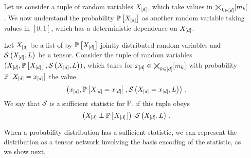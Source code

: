 

Let us consider a tuple of random variables $X_{[d]}$, which take values in $\bigtimes_{k\in[d]}[m_{k}]$.
We now understand the probability $\mathbb{P}\left[X_{[d]}\right]$ as another random variable taking values in $[0,1]$, which has a deterministic dependence on $X_{[d]}$.

\begin{definition}
    Let $X_{[d]}$ be a list of by $\mathbb{P}\left[X_{[d]}\right]$ jointly distributed random variables and $\mathcal{S}\left(X_{[d]},L\right)$ be a tensor.
    Consider the tuple of random variables $(X_{[d]},\mathbb{P}\left[X_{[d]}\right],\mathcal{S}\left(X_{[d]},L\right))$, which takes for $x_{[d]}\in\bigtimes_{k\in[d]}[m_{k}]$ with probability $\mathbb{P}\left[X_{[d]}=x_{[d]}\right]$ the value
    \begin{align*}
        \left(x_{[d]},\mathbb{P}\left[X_{[d]}=x_{[d]}\right],\mathcal{S}\left(X_{[d]}=x_{[d]},L\right)\right) \, .
    \end{align*}
    We say that $\mathcal{S}$ is a sufficient statistic for $\mathbb{P}$, if this tuple obeys
    \begin{align*}
        \left(X_{[d]}\perp\mathbb{P}\left[X_{[d]}\right]\middle)\right| \mathcal{S}\left(X_{[d]},L\right) \, .
    \end{align*}
\end{definition}

When a probability distribution has a sufficient statistic, we can represent the distribution as a tensor network involving the basis encoding of the statistic, as we show next.

